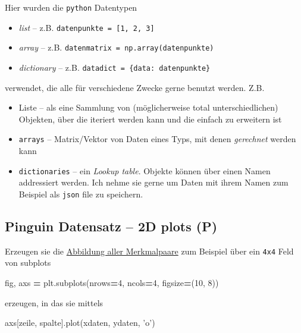 \documentclass[]{book}
\newenvironment{Shaded}{\begin{snugshade}}{\end{snugshade}}
\newcommand{\DecValTok}[1]{\textcolor[rgb]{0.00,0.00,0.81}{#1}}
\newcommand{\NormalTok}[1]{#1}
\newcommand{\OperatorTok}[1]{\textcolor[rgb]{0.81,0.36,0.00}{\textbf{#1}}}
\newcommand{\StringTok}[1]{\textcolor[rgb]{0.31,0.60,0.02}{#1}}
\providecommand{\tightlist}{%
  \setlength{\itemsep}{0pt}\setlength{\parskip}{0pt}}
\theoremstyle{definition}
\theoremstyle{definition}
\theoremstyle{definition}
\theoremstyle{definition}
\theoremstyle{remark}
\begin{document}
Hier wurden die \texttt{python} Datentypen

\begin{itemize}
\tightlist
\item
  \emph{list} -- z.B. \texttt{datenpunkte\ =\ {[}1,\ 2,\ 3{]}}
\item
  \emph{array} -- z.B. \texttt{datenmatrix\ =\ np.array(datenpunkte)}
\item
  \emph{dictionary} -- z.B. \texttt{datadict\ =\ \{\textquotesingle{}data\textquotesingle{}:\ datenpunkte\}}
\end{itemize}

verwendet, die alle für verschiedene Zwecke gerne benutzt werden. Z.B.

\begin{itemize}
\tightlist
\item
  Liste -- als eine Sammlung von (möglicherweise total unterschiedlichen) Objekten, über die iteriert werden kann und die einfach zu erweitern ist
\item
  \texttt{arrays} -- Matrix/Vektor von Daten eines Typs, mit denen \emph{gerechnet} werden kann
\item
  \texttt{dictionaries} -- ein \emph{Lookup table}. Objekte können über einen Namen addressiert werden. Ich nehme sie gerne um Daten mit ihrem Namen zum Beispiel als \texttt{json} file zu speichern.
\end{itemize}

\hypertarget{pinguin-datensatz-2d-plots-p}{%
\subsection{Pinguin Datensatz -- 2D plots (P)}\label{pinguin-datensatz-2d-plots-p}}

Erzeugen sie die \protect\hyperlink{fig:05-penguin-allpairs}{Abbildung aller Merkmalpaare} zum Beispiel über ein \texttt{4x4} Feld von subplots

\begin{Shaded}
\begin{Highlighting}[]
\NormalTok{fig, axs }\OperatorTok{=}\NormalTok{ plt.subplots(nrows}\OperatorTok{=}\DecValTok{4}\NormalTok{, ncols}\OperatorTok{=}\DecValTok{4}\NormalTok{, figsize}\OperatorTok{=}\NormalTok{(}\DecValTok{10}\NormalTok{, }\DecValTok{8}\NormalTok{))}
\end{Highlighting}
\end{Shaded}

erzeugen, in das sie mittels

\begin{Shaded}
\begin{Highlighting}[]
\NormalTok{axs[zeile, spalte].plot(xdaten, ydaten, }\StringTok{'o'}\NormalTok{)}
\end{Highlighting}
\end{Shaded}
\end{document}
